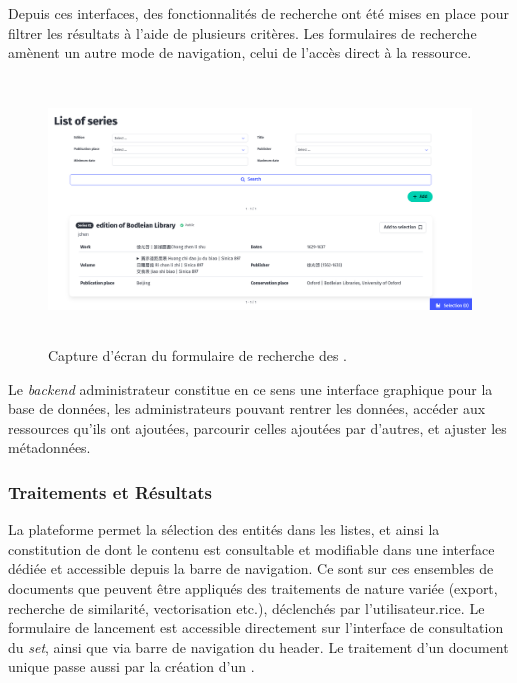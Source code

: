 Depuis ces interfaces, des fonctionnalités de recherche ont été mises en
place pour filtrer les résultats à l'aide de plusieurs critères. Les
formulaires de recherche amènent un autre mode de navigation, celui de
l'accès direct à la ressource.

\begin{figure}[H]
	\begin{center}
		\includegraphics[height=7cm]{figues/serie_form_list.png}
	\end{center}
	\caption{Capture d'écran du formulaire de recherche des \sers.}
	\label{fig:form_recherche} \end{figure}

Le \textit{backend} administrateur constitue en ce sens une interface graphique
pour la base de données, les administrateurs pouvant rentrer les
données, accéder aux ressources qu'ils ont ajoutées, parcourir celles
ajoutées par d'autres, et ajuster les métadonnées.

\hypertarget{traitements-et-resultats}{%
\subsubsection{Traitements et Résultats}\label{traitements-et-resultats}}

La plateforme permet la sélection des entités dans les listes, et ainsi
la constitution de \dss dont le contenu est consultable et
modifiable dans une interface dédiée et accessible depuis la barre de
navigation. Ce sont sur ces ensembles de documents que peuvent être
appliqués des traitements de nature variée (export, recherche de
similarité, vectorisation etc.), déclenchés par l'utilisateur.rice. Le
formulaire de lancement est accessible directement sur l'interface de
consultation du \emph{set}, ainsi que via barre de navigation du header. Le
traitement d'un document unique passe aussi par la création d'un \ds.

